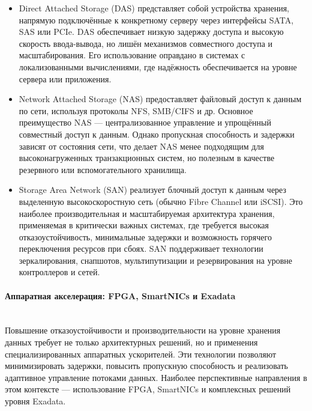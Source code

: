 \begin{itemize}
    \item Direct Attached Storage (DAS) представляет собой устройства хранения, напрямую подключённые к конкретному серверу через интерфейсы SATA, SAS или PCIe. DAS обеспечивает низкую задержку доступа и высокую скорость ввода-вывода, но лишён механизмов совместного доступа и масштабирования. Его использование оправдано в системах с локализованными вычислениями, где надёжность обеспечивается на уровне сервера или приложения.
    \item Network Attached Storage (NAS) предоставляет файловый доступ к данным по сети, используя протоколы NFS, SMB/CIFS и др. Основное преимущество NAS — централизованное управление и упрощённый совместный доступ к данным. Однако пропускная способность и задержки зависят от состояния сети, что делает NAS менее подходящим для высоконагруженных транзакционных систем, но полезным в качестве резервного или вспомогательного хранилища.
    \item Storage Area Network (SAN) реализует блочный доступ к данным через выделенную высокоскоростную сеть (обычно Fibre Channel или iSCSI). Это наиболее производительная и масштабируемая архитектура хранения, применяемая в критически важных системах, где требуется высокая отказоустойчивость, минимальные задержки и возможность горячего переключения ресурсов при сбоях. SAN поддерживает технологии зеркалирования, снапшотов, мультипутизации и резервирования на уровне контроллеров и сетей.
\end{itemize}

\paragraph{Аппаратная акселерация: FPGA, SmartNICs и Exadata} ~\\
Повышение отказоустойчивости и производительности на уровне хранения данных требует не только архитектурных решений, но и применения специализированных аппаратных ускорителей. Эти технологии позволяют минимизировать задержки, повысить пропускную способность и реализовать адаптивное управление потоками данных. Наиболее перспективные направления в этом контексте — использование FPGA, SmartNICs и комплексных решений уровня Exadata.

